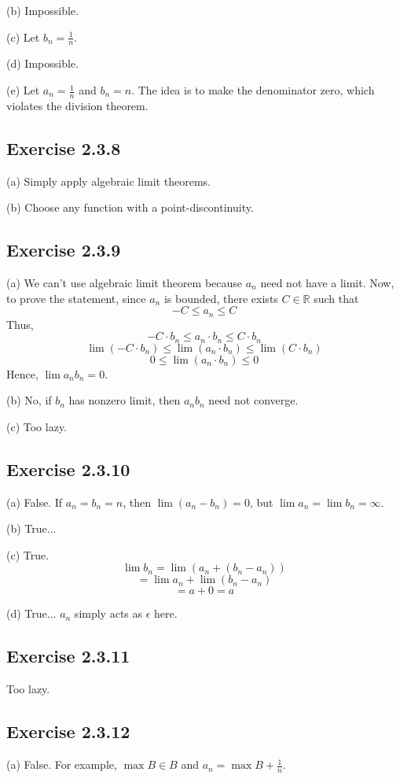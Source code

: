 \documentclass{book}
\begin{document}
\noindent
(b)
Impossible.

\noindent
(c)
Let $b_n = \frac{1}{n}$.

\noindent
(d)
Impossible.

\noindent
(e)
Let $a_n = \frac{1}{n}$ and $b_n = n$. The idea is to make the denominator zero, which violates the division theorem.

\subsection*{Exercise 2.3.8}
(a)
Simply apply algebraic limit theorems.

\noindent
(b)
Choose any function with a point-discontinuity.

\subsection*{Exercise 2.3.9}
(a)
We can't use algebraic limit theorem because $a_n$ need not have a limit. Now, to prove the statement, since $a_n$ is bounded, there exists $C \in \mathbb{R}$ such that
$$-C \leq a_n \leq C$$
Thus,
$$-C \cdot b_n \leq a_n \cdot b_n \leq C \cdot b_n$$
$$\lim \left( -C \cdot b_n \right) \leq \lim \left( a_n \cdot b_n \right) \leq \lim \left( C \cdot b_n \right)$$
$$0 \leq \lim \left( a_n \cdot b_n \right) \leq 0$$
Hence, $\lim a_n b_n = 0$.

\noindent
(b)
No, if $b_n$ has nonzero limit, then $a_n b_n$ need not converge.

\noindent
(c)
Too lazy.

\subsection*{Exercise 2.3.10}
(a)
False. If $a_n = b_n = n$, then $\lim (a_n - b_n) = 0$, but $\lim a_n = \lim b_n = \infty$.

\noindent
(b)
True...

\noindent
(c)
True.
$$\lim b_n = \lim \left( a_n + (b_n - a_n) \right)$$
$$= \lim a_n + \lim (b_n - a_n)$$
$$= a + 0 = a$$

\noindent
(d)
True... $a_n$ simply acts as $\epsilon$ here.

\subsection*{Exercise 2.3.11}
Too lazy.

\subsection*{Exercise 2.3.12}
(a)
False. For example, $\max B \in B$ and $a_n = \max B + \frac{1}{n}$.
\end{document}
